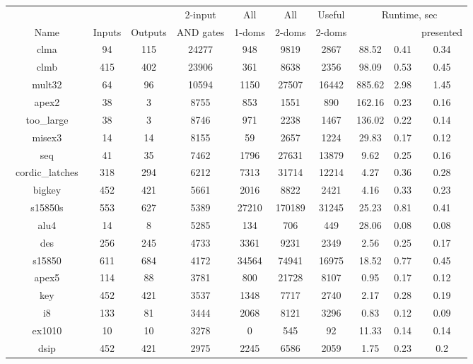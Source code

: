 \documentclass{llncs}
\begin{document}
\begin{table*}[t!]\centering
\begin{tabular}{|@{}c@{}|c|c|c||c|c|c||c|c|c|} \hline
            & 	      &     	                &  2-input       & All       & All      & Useful &\multicolumn{3}{c|}{Runtime, sec} \\ \cline{8-10}
Name  &  Inputs     & Outputs 	& AND gates  & 1-doms 	& 2-doms   & 2-doms  &\cite{DuTM04} & \cite{TeD05b} & presented  \\ \hline \hline

clma	&	94	&	115	&	24277	&	948	&	9819	&	2867	&	88.52	&	 0.41	 &	 0.34	\\
clmb	&	415	&	402	&	23906	&	361	&	8638	&	2356	&	98.09	&	 0.53	 &	 0.45	\\
mult32	&	64	&	96	&	10594	&	1150	&	27507	&	16442	&	885.62	 &	 2.98	 &	 1.45	\\
apex2	&	38	&	3	&	8755	&	853	&	1551	&	890	&	162.16	&	 0.23	 &	 0.16	 \\
too\_large	&	38	&	3	&	8746	&	971	&	2238	&	1467	&	136.02	 &	 0.22	 &	 0.14	\\
misex3	&	14	&	14	&	8155	&	59	&	2657	&	1224	&	29.83	&	 0.17	 &	 0.12	\\
seq	&	41	&	35	&	7462	&	1796	&	27631	&	13879	&	9.62	&	 0.25	 &	 0.16	\\
~cordic\_latches~	&	318	&	294	&	6212	&	7313	&	31714	&	12214	&	 4.27	 &	 0.36	&	0.28	 \\
bigkey	&	452	&	421	&	5661	&	2016	&	8822	&	2421	&	4.16	 &	 0.33	 &	 0.23	\\
s15850s	&	553	&	627	&	5389	&	27210	&	170189	&	31245	&	25.23	 &	 0.81	 &	 0.41	\\
alu4	&	14	&	8	&	5285	&	134	&	706	&	449	&	28.06	&	0.08	 &	 0.08	 \\
des	&	256	&	245	&	4733	&	3361	&	9231	&	2349	&	2.56	&	 0.25	 &	 0.17	\\
s15850	&	611	&	684	&	4172	&	34564	&	74941	&	16975	&	18.52	 &	 0.77	 &	 0.45	\\
apex5	&	114	&	88	&	3781	&	800	&	21728	&	8107	&	0.95	&	 0.17	 &	 0.12	\\
key	&	452	&	421	&	3537	&	1348	&	7717	&	2740	&	2.17	&	 0.28	 &	 0.19	\\
i8	&	133	&	81	&	3444	&	2068	&	8121	&	3296	&	0.83	&	 0.12	 &	 0.09	\\
ex1010	&	10	&	10	&	3278	&	0	&	545	&	92	&	11.33	&	0.14	 &	 0.14	 \\
dsip	&	452	&	421	&	2975	&	2245	&	6586	&	2059	&	1.75	 &	 0.23	 &	 0.2	\\

\end{tabular}
\end{table*}
\end{document}
